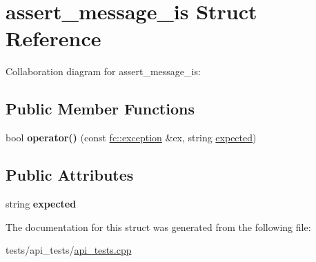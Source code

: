 \hypertarget{structassert__message__is}{}\section{assert\+\_\+message\+\_\+is Struct Reference}
\label{structassert__message__is}


Collaboration diagram for assert\+\_\+message\+\_\+is\+:
\subsection*{Public Member Functions}
\begin{DoxyCompactItemize}
\item 
\mbox{\label{structassert__message__is_ae38a38cc20f7f419ad9cba99a367614f}} 
bool {\bfseries operator()} (const \mbox{\hyperlink{classfc_1_1exception}{fc\+::exception}} \&ex, string \mbox{\hyperlink{structexpected}{expected}})
\end{DoxyCompactItemize}
\subsection*{Public Attributes}
\begin{DoxyCompactItemize}
\item 
\mbox{\label{structassert__message__is_ac16a6d64ee97e5c6234f06155003150e}} 
string {\bfseries expected}
\end{DoxyCompactItemize}


The documentation for this struct was generated from the following file\+:\begin{DoxyCompactItemize}
\item 
tests/api\+\_\+tests/\mbox{\hyperlink{api__tests_8cpp}{api\+\_\+tests.\+cpp}}\end{DoxyCompactItemize}
